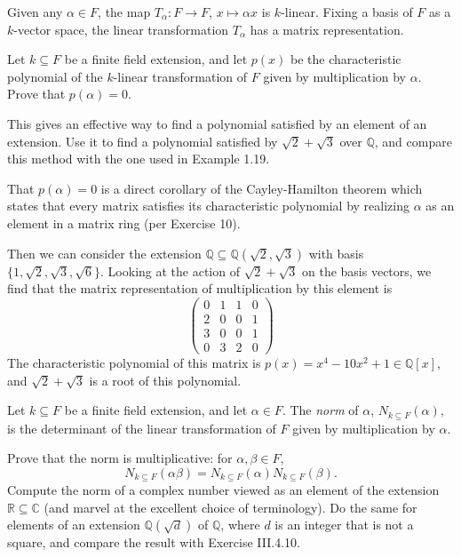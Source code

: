 \documentclass[../../master.tex]{subfiles}
\begin{document}
\begin{solution}
    Given any $\alpha \in F$, the map $T_{\alpha} : F \to F$, $x \mapsto \alpha x$ is $k$-linear.
    Fixing a basis of $F$ as a $k$-vector space, the linear transformation $T_{\alpha}$ has a matrix representation.
\end{solution}

\begin{problem}
    Let $k \subseteq F$ be a finite field extension, and let $p(x)$ be the characteristic polynomial of the $k$-linear transformation of $F$ given by multiplication by $\alpha$.
    Prove that $p(\alpha) = 0$.

    This gives an effective way to find a polynomial satisfied by an element of an extension.
    Use it to find a polynomial satisfied by $\sqrt{2} + \sqrt{3}$ over $\mathbb{Q}$, and compare this method with the one used in Example 1.19.
\end{problem}

\begin{solution}
    That $p(\alpha) = 0$ is a direct corollary of the Cayley-Hamilton theorem which states that every matrix satisfies its characteristic polynomial by realizing $\alpha$ as an element in a matrix ring (per Exercise 10).

    Then we can consider the extension $\mathbb{Q} \subseteq \mathbb{Q}(\sqrt{2}, \sqrt{3})$ with basis $\{1, \sqrt{2}, \sqrt{3}, \sqrt{6}\}$.
    Looking at the action of $\sqrt{2} + \sqrt{3}$ on the basis vectors, we find that the matrix representation of multiplication by this element is
    \[
    \begin{pmatrix}
        0 & 1 & 1 & 0 \\
        2 & 0 & 0 & 1 \\
        3 & 0 & 0 & 1 \\
        0 & 3 & 2 & 0
    \end{pmatrix}
    \]
    The characteristic polynomial of this matrix is $p(x) = x^{4} - 10x^2 + 1 \in \mathbb{Q}[x]$, and $\sqrt{2} + \sqrt{3}$ is a root of this polynomial.
\end{solution}

\begin{problem}
    Let $k \subseteq F$ be a finite field extension, and let $\alpha \in F$.
    The \textit{norm} of $\alpha$, $N_{k \subseteq F}(\alpha)$, is the determinant of the linear transformation of $F$ given by multiplication by $\alpha$.

    Prove that the norm is multiplicative: for $\alpha, \beta \in F$,
    \[
        N_{k \subseteq F} (\alpha \beta) = N_{k \subseteq F} (\alpha) N_{k \subseteq F} (\beta).
    \]
    Compute the norm of a complex number viewed as an element of the extension $\mathbb{R} \subseteq \mathbb{C}$ (and marvel at the excellent choice of terminology).
    Do the same for elements of an extension $\mathbb{Q}(\sqrt{d})$ of $\mathbb{Q}$, where $d$ is an integer that is not a square, and compare the result with Exercise III.4.10.
\end{problem}
\end{document}
